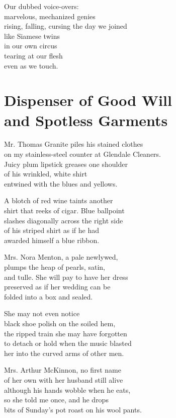\documentclass[twoside,10pt]{book}
\begin{document}
Our dubbed voice-overs:\\
marvelous, mechanized genies\\
rising, falling, cursing the day we joined\\
like Siamese twins\\
in our own circus\\
tearing at our flesh\\
even as we touch.


\clearpage
\section{Dispenser of Good Will\\ and Spotless Garments}

Mr. Thomas Granite piles his stained clothes\\
on my stainless-steel counter at Glendale Cleaners.\\
Juicy plum lipstick greases one shoulder\\
of his wrinkled, white shirt\\
entwined with the blues and yellows.

A blotch of red wine taints another\\
shirt that reeks of cigar. Blue ballpoint\\
slashes diagonally across the right side\\
of his striped shirt as if he had\\
awarded himself a blue ribbon.

Mrs. Nora Menton, a pale newlywed,\\
plumps the heap of pearls, satin,\\
and tulle. She will pay to have her dress\\
preserved as if her wedding can be\\
folded into a box and sealed.

She may not even notice\\
black shoe polish on the soiled hem,\\
the ripped train she may have forgotten\\
to detach or hold when the music blasted\\
her into the curved arms of other men.

Mrs. Arthur McKinnon, no first name\\
of her own with her husband still alive\\
although his hands wobble when he eats,\\
so she told me once, and he drops\\
bits of Sunday's pot roast on his wool pants.
\end{document}
